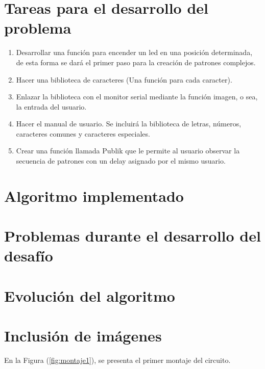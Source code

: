 \documentclass{article}
\begin{document}
\section{Tareas para el desarrollo del problema} \label{imagenes}
\begin{enumerate}
  \item Desarrollar una función para encender un led en una posición determinada, de esta forma se dará el primer paso para la creación de patrones complejos.
  \item Hacer una biblioteca de caracteres (Una función para cada caracter).
  \item Enlazar la biblioteca con el monitor serial mediante la función imagen, o sea, la entrada del usuario.
  \item Hacer el manual de usuario. Se incluirá la biblioteca de letras, números, caracteres comunes y caracteres especiales.
  \item Crear una función llamada Publik que le permite al usuario observar la secuencia de patrones con un delay asignado por el mismo usuario.
\end{enumerate}


\section{Algoritmo implementado} \label{imagenes}
\section{Problemas durante el desarrollo del desafío} \label{imagenes}
\section{Evolución del algoritmo} \label{imagenes}

\section{Inclusión de imágenes} \label{imagenes}

En la Figura (\ref{fig:montaje1}), se presenta el primer montaje del circuito. 
\end{document}
